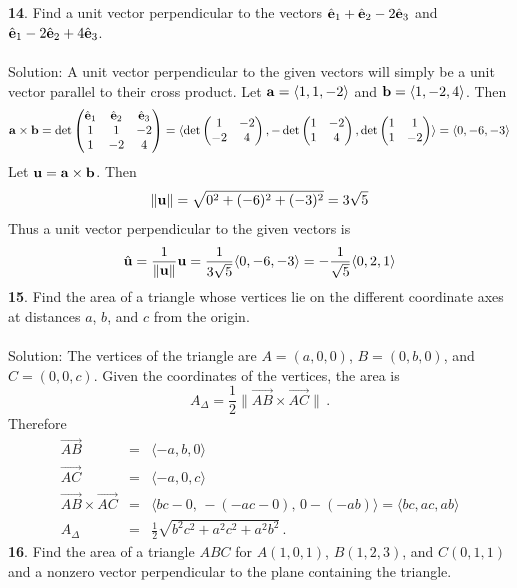 \documentclass[12pt]{amsbook}
\newcommand{\la}{\langle}
\newcommand{\ra}{\rangle}
\begin{document}
\\
\\
{\small\bf 14}. Find a unit vector perpendicular to the vectors
$\hat{\bf e}_1+\hat{\bf e}_2-2\hat{\bf e}_3$ and
$\hat{\bf e}_1-2\hat{\bf e}_2+4\hat{\bf e}_3$.\\
\\
{\sc Solution}:
A unit vector perpendicular to the given vectors will simply be a unit vector parallel to their cross product. Let ${\bf a}=\la 1,1,-2 \ra$ and ${\bf b}=\la 1,-2,4 \ra$. Then
$${\bf a}\times{\bf b}=\det\begin{pmatrix} \hat{\bf e}_1 & \hat{\bf e}_2 & \hat{\bf e}_3\cr 1&1&-2\cr 1&-2&4 \cr \end{pmatrix}= \la \det\begin{pmatrix}
1&-2\cr -2&4\cr \end{pmatrix},-\det\begin{pmatrix} 1&-2\cr 1&4\cr \end{pmatrix},\det\begin{pmatrix} 1&1\cr 1&-2\cr\end{pmatrix}\ra =\la 0,-6,-3 \ra $$
Let ${\bf u}={\bf a}\times{\bf b}$. Then 
$$\|{\bf u}\|=\sqrt{0^2+(-6)^2+(-3)^2}=3\sqrt{5}$$
Thus a unit vector perpendicular to the given vectors is 
$$\hat{\bf u}=\frac{1}{\|{\bf u}\|}{\bf u}=\frac{1}{3\sqrt{5}}\la 0,-6,-3 \ra=-\frac {1}{\sqrt{5}} \la 0,2,1 \ra$$
{\small\bf 15}. Find the area of a triangle whose vertices 
lie on the different coordinate axes at distances $a$, $b$, and $c$
from the origin.\\ 
\\
{\sc Solution}: The vertices of the triangle are $A=(a,0,0)$,
$B=(0,b,0)$, and $C=(0,0,c)$. Given the coordinates of the vertices,
the area is 
$$
A_\Delta =\frac 12\|\overrightarrow{AB}\times\overrightarrow{AC}\|\,.
$$
Therefore
\begin{eqnarray*}
\overrightarrow{AB}&=&\langle -a,b,0\rangle\\
\overrightarrow{AC}&=&\langle -a,0,c\rangle\\
\overrightarrow{AB}\times\overrightarrow{AC}&=&
\langle bc-0,\, -(-ac-0),\,0-(-ab)\rangle
=\langle bc,ac,ab\rangle\\
A_\Delta&=&\frac 12\sqrt{b^2c^2+a^2c^2+a^2b^2}\,.
\end{eqnarray*}
{\small\bf 16}. Find the area of a triangle $ABC$ for $A(1, 0, 1)$,
$B(1, 2, 3)$, and $C(0, 1, 1)$ and a nonzero vector perpendicular
to the plane containing the triangle.\\
\\
\end{document}
